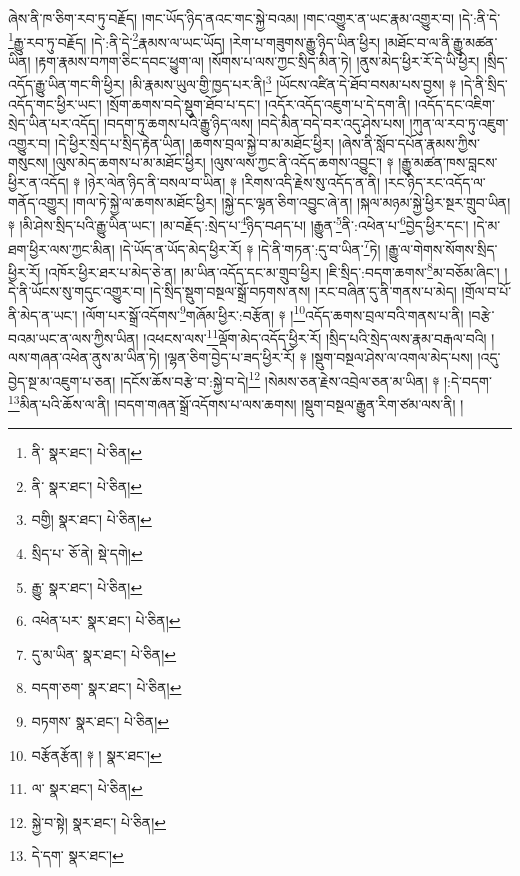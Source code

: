 ཞེས་ནི་ཁ་ཅིག་རབ་ཏུ་བརྗོད། །གང་ཡོད་ཉིད་ནའང་གང་སྐྱེ་བའམ། །གང་འགྱུར་ན་ཡང་རྣམ་འགྱུར་བ། །དེ་:ནི་དེ་\footnote{ནི་  སྣར་ཐང་།  པེ་ཅིན། }རྒྱུ་རབ་ཏུ་བརྗོད། །དེ་:ནི་དེ་\footnote{ནི་  སྣར་ཐང་།  པེ་ཅིན། }རྣམས་ལ་ཡང་ཡོད། །རེག་པ་གཟུགས་རྒྱུ་ཉིད་ཡིན་ཕྱིར། །མཐོང་བ་ལ་ནི་རྒྱུ་མཚན་ཡིན། །རྟག་རྣམས་བཀག་ཅིང་དབང་ཕྱུག་ལ། །སོགས་པ་ལས་ཀྱང་སྲིད་མིན་ཏེ། །ནུས་མེད་ཕྱིར་རོ་དེ་ཡི་ཕྱིར། །སྲིད་འདོད་རྒྱུ་ཡིན་གང་གི་ཕྱིར། །མི་རྣམས་ཡུལ་གྱི་ཁྱད་པར་ནི།\footnote{བགྱི།  སྣར་ཐང་།  པེ་ཅིན། } །ཡོངས་འཛིན་དེ་ཐོབ་བསམ་པས་བྱས། ༈ །དེ་ནི་སྲིད་འདོད་གང་ཕྱིར་ཡང་། །སྲོག་ཆགས་བདེ་སྡུག་ཐོབ་པ་དང་། །འདོར་འདོད་འཇུག་པ་དེ་དག་ནི། །འདོད་དང་འཇིག་སྲེད་ཡིན་པར་འདོད། །བདག་ཏུ་ཆགས་པའི་རྒྱུ་ཉིད་ལས། །བདེ་མིན་བདེ་བར་འདུ་ཤེས་པས། །ཀུན་ལ་རབ་ཏུ་འཇུག་འགྱུར་བ། །དེ་ཕྱིར་སྲེད་པ་སྲིད་རྟེན་ཡིན། །ཆགས་བྲལ་སྐྱེ་བ་མ་མཐོང་ཕྱིར། །ཞེས་ནི་སློབ་དཔོན་རྣམས་ཀྱིས་གསུངས། །ལུས་མེད་ཆགས་པ་མ་མཐོང་ཕྱིར། །ལུས་ལས་ཀྱང་ནི་འདོད་ཆགས་འབྱུང་། ༈ །རྒྱུ་མཚན་ཁས་བླངས་ཕྱིར་ན་འདོད། ༈ །ཉེར་ལེན་ཉིད་ནི་བསལ་བ་ཡིན། ༈ །རིགས་འདི་རྗེས་སུ་འདོད་ན་ནི། །རང་ཉིད་རང་འདོད་ལ་གནོད་འགྱུར། །གལ་ཏེ་སྐྱེ་ལ་ཆགས་མཐོང་ཕྱིར། །སྐྱེ་དང་ལྷན་ཅིག་འབྱུང་ཞེ་ན། །སྐལ་མཉམ་སྐྱེ་ཕྱིར་སྔར་གྲུབ་ཡིན། ༈ །མི་ཤེས་སྲིད་པའི་རྒྱུ་ཡིན་ཡང་། །མ་བརྗོད་:སྲེད་པ་\footnote{སྲིད་པ་  ཅོ་ནེ།  སྡེ་དགེ། }ཉིད་བཤད་པ། །རྒྱུན་\footnote{རྒྱུ་  སྣར་ཐང་།  པེ་ཅིན། }ནི་:འཕེན་པ་\footnote{འཕེན་པར་  སྣར་ཐང་།  པེ་ཅིན། }བྱེད་ཕྱིར་དང་། །དེ་མ་ཐག་ཕྱིར་ལས་ཀྱང་མིན། །དེ་ཡོད་ན་ཡོད་མེད་ཕྱིར་རོ། ༈ །དེ་ནི་གཏན་:དུ་བ་ཡིན་\footnote{དུ་མ་ཡིན་  སྣར་ཐང་།  པེ་ཅིན། }ཏེ། །རྒྱུ་ལ་གེགས་སོགས་སྲིད་ཕྱིར་རོ། །འཁོར་ཕྱིར་ཐར་པ་མེད་ཅེ་ན། །མ་ཡིན་འདོད་དང་མ་གྲུབ་ཕྱིར། །ཇི་སྲིད་:བདག་ཆགས་\footnote{བདག་ཅག་  སྣར་ཐང་།  པེ་ཅིན། }མ་བཅོམ་ཞིང་། །དེ་ནི་ཡོངས་སུ་གདུང་འགྱུར་བ། །དེ་སྲིད་སྡུག་བསྔལ་སྒྲོ་བཏགས་ནས། །རང་བཞིན་དུ་ནི་གནས་པ་མེད། །གྲོལ་བ་པོ་ནི་མེད་ན་ཡང་། །ལོག་པར་སྒྲོ་འདོགས་\footnote{བཏགས་  སྣར་ཐང་།  པེ་ཅིན། }གཞོམ་ཕྱིར་:བརྩོན། ༈ །\footnote{བརྩོནརྩོན། ༈ །  སྣར་ཐང་། }འདོད་ཆགས་བྲལ་བའི་གནས་པ་ནི། །བརྩེ་བའམ་ཡང་ན་ལས་ཀྱིས་ཡིན། །འཕངས་ལས་\footnote{ལ་  སྣར་ཐང་།  པེ་ཅིན། }ལྡོག་མེད་འདོད་ཕྱིར་རོ། །སྲིད་པའི་སྲེད་ལས་རྣམ་བརྒལ་བའི། །ལས་གཞན་འཕེན་ནུས་མ་ཡིན་ཏེ། །ལྷན་ཅིག་བྱེད་པ་ཟད་ཕྱིར་རོ། ༈ །སྡུག་བསྔལ་ཤེས་ལ་འགལ་མེད་པས། །འདུ་བྱེད་སྔ་མ་འཇུག་པ་ཅན། །དངོས་ཆོས་བརྩེ་བ་:སྐྱེ་བ་དེ།\footnote{སྐྱེ་བ་སྟེ།  སྣར་ཐང་།  པེ་ཅིན། } །སེམས་ཅན་རྗེས་འབྲེལ་ཅན་མ་ཡིན། ༈ །:དེ་བདག་\footnote{དེ་དག་  སྣར་ཐང་། }མིན་པའི་ཆོས་ལ་ནི། །བདག་གཞན་སྒྲོ་འདོགས་པ་ལས་ཆགས། །སྡུག་བསྔལ་རྒྱུན་རིག་ཙམ་ལས་ནི། །
